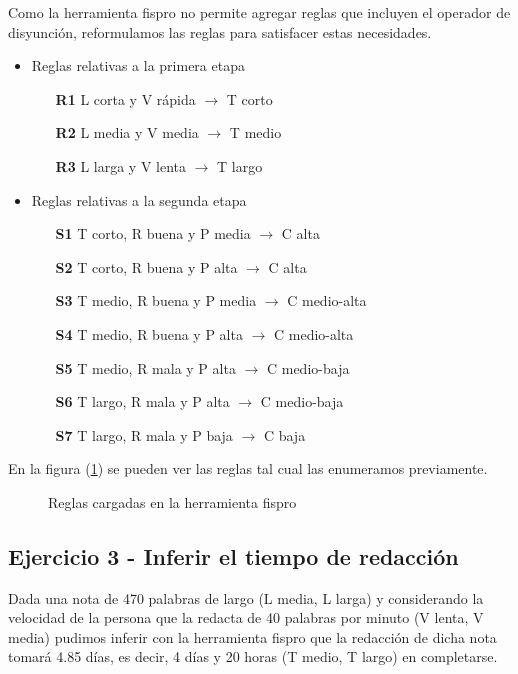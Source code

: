 \documentclass{article}
\begin{document}
Como la herramienta fispro no permite agregar reglas que incluyen el operador de disyunción, reformulamos las reglas para satisfacer estas necesidades.

\begin{itemize}
	\item Reglas relativas a la primera etapa
	\begin{itemize}
		\item [\textbf{R1}] L corta y V rápida $\rightarrow$ T corto
		\item [\textbf{R2}] L media y V media $\rightarrow$ T medio
		\item [\textbf{R3}] L larga y V lenta $\rightarrow$ T largo
	\end{itemize}
	\item Reglas relativas a la segunda etapa
	\begin{itemize}
		\item [\textbf{S1}] T corto, R buena y P media $\rightarrow$ C alta
		\item [\textbf{S2}] T corto, R buena y P alta $\rightarrow$ C alta
		\item [\textbf{S3}] T medio, R buena y P media $\rightarrow$ C medio-alta
		\item [\textbf{S4}] T medio, R buena y P alta $\rightarrow$ C medio-alta
		\item [\textbf{S5}] T medio, R mala y P alta $\rightarrow$ C medio-baja
		\item [\textbf{S6}] T largo, R mala y P alta $\rightarrow$ C medio-baja
		\item [\textbf{S7}]T largo, R mala y P baja $\rightarrow$ C baja
	\end{itemize}
\end{itemize}

En la figura (\ref{fig:reglas}) se pueden ver las reglas tal cual las enumeramos previamente.

\begin{figure}[H]
	\centering
	\caption{Reglas cargadas en la herramienta fispro}
	\label{fig:reglas}
\end{figure}

\subsection*{Ejercicio 3 - Inferir el tiempo de redacción}
Dada una nota de 470 palabras de largo (L media, L larga) y considerando la velocidad de la persona que la redacta de 40 palabras por minuto (V lenta, V media) pudimos inferir con la herramienta fispro que la redacción de dicha nota tomará 4.85 días, es decir, 4 días y 20 horas (T medio, T largo) en completarse.
\end{document}
